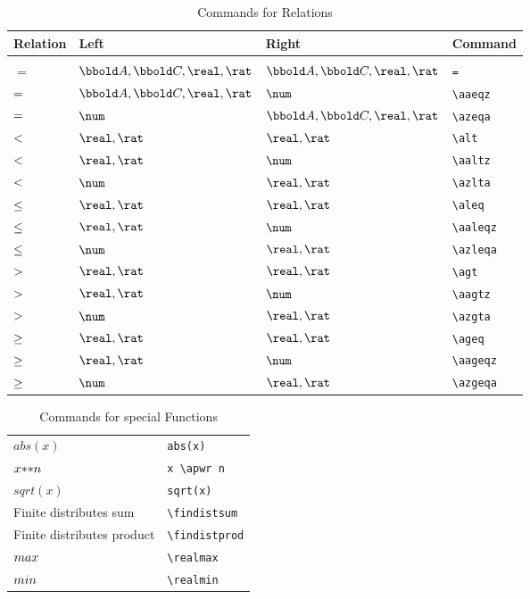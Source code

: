 \documentclass[12pt]{article}
\begin{document}
\begin{table}[htbp]
  \centering
  \begin{tabular}{llll}
    Relation & Left & Right & Command \\
    \hline \\
    $=$ & $\arithmos, \complex, \real, \rat$ & $\arithmos, \complex, \real, \rat$ & \verb|=| \\
    $=$ & $\arithmos, \complex, \real, \rat$ & $\num$ & \verb|\aaeqz| \\
    $=$ & $\num$ & $\arithmos, \complex, \real, \rat$ & \verb|\azeqa| \\
    $<$ & $\real, \rat$ & $\real, \rat$ & \verb|\alt| \\
    $<$ & $\real, \rat$ & $\num$ & \verb|\aaltz| \\
    $<$ & $\num$ & $\real, \rat$ & \verb|\azlta| \\
    $\leq$ & $\real, \rat$ & $\real, \rat$ & \verb|\aleq| \\
    $\leq$ & $\real, \rat$ & $\num$ & \verb|\aaleqz| \\
    $\leq$ & $\num$ & $\real, \rat$ & \verb|\azleqa| \\
    $>$ & $\real, \rat$ & $\real, \rat$ & \verb|\agt| \\
    $>$ & $\real, \rat$ & $\num$ & \verb|\aagtz| \\
    $>$ & $\num$ & $\real, \rat$ & \verb|\azgta| \\
    $\geq$ & $\real, \rat$ & $\real, \rat$ & \verb|\ageq| \\
    $\geq$ & $\real, \rat$ & $\num$ & \verb|\aageqz| \\
    $\geq$ & $\num$ & $\real, \rat$ & \verb|\azgeqa| \\
    \hline
  \end{tabular}
  \caption{Commands for Relations}
  \label{tab:latex-relations}
\end{table}
%
\begin{table}[htbp]
  \centering
  \begin{tabular}{ll}
    $abs(x)$    & \verb|abs(x)| \\
    $x {*}{*} n$    & \verb|x \apwr n| \\
    $sqrt(x)$    & \verb|sqrt(x)| \\
    Finite distributes sum & \verb|\findistsum| \\
    Finite distributes product & \verb|\findistprod| \\
    $max$ & \verb|\realmax| \\
    $min$ & \verb|\realmin| \\
  \end{tabular}
  \caption{Commands for special Functions}
  \label{tab:latex-special-functions}
\end{table}
\end{document}
